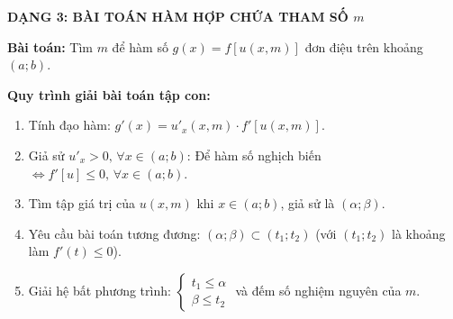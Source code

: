 \documentclass[12pt, a4paper]{article}
\begin{document}
\newpage
\begin{theorybox}
    \textbf{\textcolor{deepblue}{\large DẠNG 3: BÀI TOÁN HÀM HỢP CHỨA THAM SỐ $m$}}
    \par\vspace{0.15cm}
    \textbf{Bài toán:} Tìm $m$ để hàm số $g(x) = f[u(x, m)]$ đơn điệu trên khoảng $(a; b)$.
    \par\vspace{0.1cm}
    \textbf{Quy trình giải bài toán tập con:}
    \begin{enumerate}
        \item Tính đạo hàm: $g'(x) = u'_x(x, m) \cdot f'[u(x, m)]$.
        \item Giả sử $u'_x > 0, \, \forall x \in (a; b)$: Để hàm số nghịch biến $\iff f'[u] \le 0, \, \forall x \in (a; b)$.
        \item Tìm tập giá trị của $u(x, m)$ khi $x \in (a; b)$, giả sử là $(\alpha; \beta)$.
        \item Yêu cầu bài toán tương đương: $(\alpha; \beta) \subset (t_1; t_2)$ (với $(t_1; t_2)$ là khoảng làm $f'(t) \le 0$).
        \item Giải hệ bất phương trình: $\begin{cases} t_1 \le \alpha \\ \beta \le t_2 \end{cases}$ và đếm số nghiệm nguyên của $m$.
    \end{enumerate}
\end{theorybox}

\end{document}
